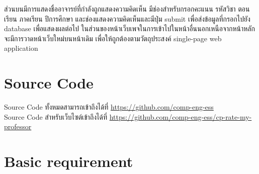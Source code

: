 \documentclass[17pt]{extarticle}
\begin{document}
\par ส่วนบนมีการแสดงชื่ออาจารย์ที่กำลังถูกแสดงความคิดเห็น มีช่องสำหรับกรอกคะแนน รหัสวิชา ตอนเรียน ภาคเรียน ปีการศึกษา และช่องแสดงความคิดเห็นและมีปุ่ม submit เพื่อส่งข้อมูลที่กรอกไปยัง database เพื่อแสดงผลต่อไป
ในส่วนของหน้าเว็บเพจในการเข้าไปในหน้าอื่นนอกเหนือจากหน้าหลักจะมีการวาดหน้าเว็บใหม่บนหน้าเดิม เพื่อให้ถูกต้องตามวัตถุประสงค์ single-page web application
\section{Source Code}
Source Code ทั้งหมดสามารถเข้าถึงได้ที่ {\color{blue}\url{https://github.com/comp-eng-ess}}\\
Source Code สำหรับเว็บไซต์เข้าถึงได้ที่ {\color{blue}\url{https://github.com/comp-eng-ess/cp-rate-my-professor}}
\pagebreak
\section{Basic requirement}
\end{document}
